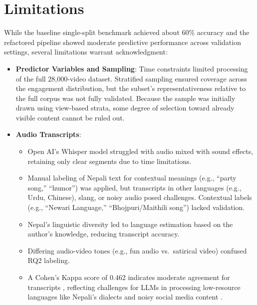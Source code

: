 \documentclass[12pt,a4paper]{report}
\begin{document}
\newpage
\section{Limitations}
\label{limitation}
While the baseline single-split benchmark achieved about 60\% accuracy and the refactored pipeline showed moderate predictive performance across validation settings, several limitations warrant acknowledgment:

\begin{itemize}
    \item \textbf{Predictor Variables and Sampling}: Time constraints limited processing of the full 28,000-video dataset. Stratified sampling ensured coverage across the engagement distribution, but the subset’s representativeness relative to the full corpus was not fully validated. Because the sample was initially drawn using view-based strata, some degree of selection toward already visible content cannot be ruled out.

    \item \textbf{Audio Transcripts}: 
        \begin{itemize}
            \item Open AI’s Whisper model struggled with audio mixed with sound effects, retaining only clear segments due to time limitations.
            \item Manual labeling of Nepali text for contextual meanings (e.g., ``party song,'' ``humor'') was applied, but transcripts in other languages (e.g., Urdu, Chinese), slang, or noisy audio posed challenges. Contextual labels (e.g., ``Newari Language,'' ``Bhojpuri/Maithili song'') lacked validation.
            \item Nepal’s linguistic diversity led to language estimation based on the author’s knowledge, reducing transcript accuracy.
            \item Differing audio-video tones (e.g., fun audio vs.\ satirical video) confused RQ2 labeling.
            \item A Cohen’s Kappa score of 0.462 indicates moderate agreement for transcripts \parencite{datatab2025, kolena2025}, reflecting challenges for LLMs in processing low-resource languages like Nepali’s dialects and noisy social media content \parencite{icuc2025, leanmean2023}.
        \end{itemize}


\end{itemize}
\end{document}
